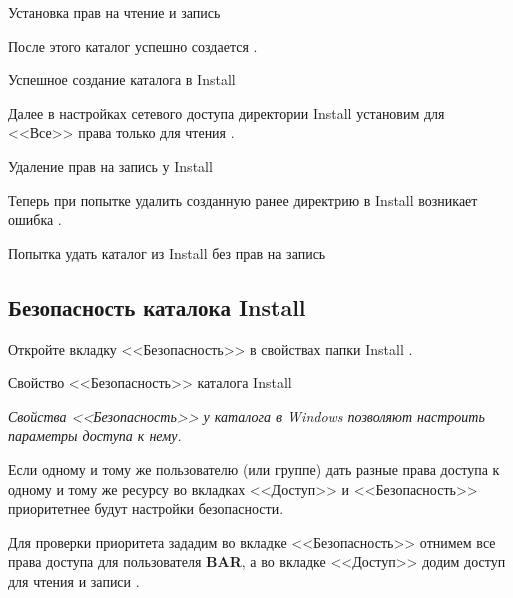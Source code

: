 \begin{image}
	\caption{Установка прав на чтение и запись}
	\label{fig:dir:inst:rw}
\end{image}

После этого каталог успешно создается .

\begin{image}
	\caption{Успешное создание каталога в Install}
	\label{fig:dir:inst:rw:create:folder}
\end{image}

Далее в настройках сетевого доступа директории Install
установим для <<Все>> права только для чтения .

\begin{image}
	\caption{Удаление прав на запись у Install}
	\label{fig:dir:inst:r:2}
\end{image}

Теперь при попытке удалить созданную ранее директрию в Install
возникает ошибка .

\begin{image}
	\caption{Попытка удать каталог из Install без прав на запись}
	\label{fig:dir:inst:r:2:error}
\end{image}

\subsection{Безопасность каталока Install}

Откройте вкладку <<Безопасность>> в свойствах папки Install
.

\begin{image}
	\caption{Свойство <<Безопасность>> каталога Install}
	\label{fig:dir:satery}
\end{image}

\textit{Свойства <<Безопасность>> у каталога в Windows
позволяют настроить параметры доступа к нему.}

Если одному и тому же пользователю (или группе) дать разные права доступа
к одному и тому же ресурсу во вкладках <<Доступ>> и <<Безопасность>>
приоритетнее будут настройки безопасности.\par
Для проверки приоритета зададим во вкладке <<Безопасность>>
отнимем все права доступа для пользователя \textbf{BAR},
а во вкладке <<Доступ>> додим доступ для чтения и записи
.

